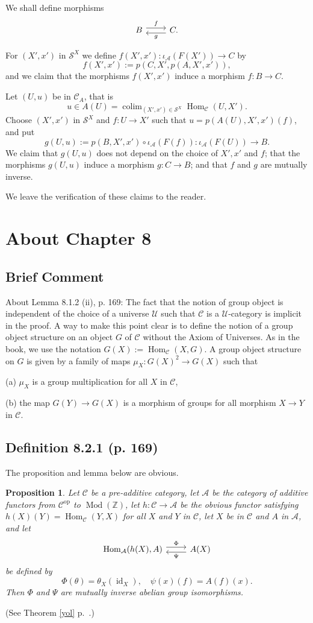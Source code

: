 \documentclass[12pt]{article}%
\newtheorem{prop}[thm]{Proposition}
\theoremstyle{remark}
\theoremstyle{definition}
\newcommand{\nn}{\noindent}
\newcommand{\bb}{\mathbb}
\newcommand{\A}{\mathcal A}
\newcommand{\C}{\mathcal C}
\newcommand{\SSS}{\mathcal S}
\newcommand{\U}{\mathcal U}
\DeclareMathOperator*{\colim}{colim}%
\DeclareMathOperator{\id}{id}
\DeclareMathOperator{\Hom}{Hom}%
\DeclareMathOperator{\Mod}{Mod}
\DeclareMathOperator{\op}{op}
\begin{document}
We shall define morphisms 
$$
\begin{tikzcd}
B\ar[yshift=.7ex]{r}{f}&C\ar[yshift=-.7ex]{l}{g}.
\end{tikzcd}
$$

For $(X',x')$ in $\SSS^X$ we define $f(X',x'):\iota_\A(F(X'))\to C$ by 
$$
f(X',x'):=p(C,X',p(A,X',x')),
$$ 
and we claim that the morphisms $f(X',x')$ induce a morphism $f:B\to C$. 

Let $(U,u)$ be in $\C_A$, that is
$$
u\in A(U)=\colim_{(X',x')\in\SSS^X}\Hom_\C(U,X').
$$ 
Choose $(X',x')$ in $\SSS^X$ and $f:U\to X'$ such that $u=p(A(U),X',x')(f)$, and put 
$$
g(U,u):=p(B,X',x')\circ\iota_\A(F(f)):\iota_\A(F(U))\to B.
$$ 
We claim that $g(U,u)$ does not depend on the choice of $X',x'$ and $f$; that the morphisms $g(U,u)$ induce a morphism $g:C\to B$; and that $f$ and $g$ are mutually inverse. 

We leave the verification of these claims to the reader. 


\section{About Chapter 8}

\subsection{Brief Comment}

About Lemma 8.1.2 (ii), p. 169: The fact that the notion of group object is independent of the choice of a universe $\U$ such that $\C$ is a $\U$-category is implicit in the proof. A way to make this point clear is to define the notion of a group object structure on an object $G$ of $\C$ without the Axiom of Universes. As in the book, we use the notation $G(X):=\Hom_\C(X,G)$. A group object structure on $G$ is given by a family of maps $\mu_X:G(X)^2\to G(X)$ such that 

\nn(a) $\mu_X$ is a group multiplication for all $X$ in $\C$, 

\nn(b) the map $G(Y)\to G(X)$ is a morphism of groups for all morphism $X\to Y$ in $\C$. 

%

\subsection{Definition 8.2.1 (p. 169)}

The proposition and lemma below are obvious. 
%
\begin{prop}\label{payp}
Let $\C$ be a pre-additive category, let $\A$ be the category of additive functors from $\C^{\op}$ to $\Mod(\bb Z)$, let $h:\C\to\A$ be the obvious functor satisfying $h(X)(Y)=\Hom_\C(Y,X)$ for all $X$ and $Y$ in $\C$, let $X$ be in $\C$ and $A$ in $\A$, and let 
$$
\begin{tikzcd}
\Hom_\A(h(X),A)\ar[yshift=.7ex]{r}{\Phi}&A(X)\ar[yshift=-.7ex]{l}{\Psi}
\end{tikzcd}
$$
be defined by 
$$
\Phi(\theta)=\theta_X(\id_X),\quad\psi(x)(f)=A(f)(x).
$$
Then $\Phi$ and $\Psi$ are mutually inverse abelian group isomorphisms.
\end{prop}
%
\nn(See Theorem \ref{yol} p.~\pageref{yol}.)
\end{document}
